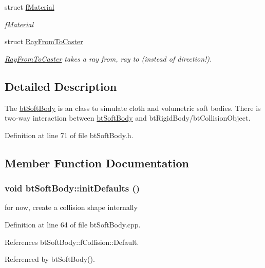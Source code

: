 \begin{CompactItemize}
struct \hyperlink{structbt_soft_body_1_1f_material}{fMaterial}
\begin{CompactList}\small\item\em \hyperlink{structbt_soft_body_1_1f_material}{fMaterial} \item\end{CompactList}\item 
struct \hyperlink{structbt_soft_body_1_1_ray_from_to_caster}{RayFromToCaster}
\begin{CompactList}\small\item\em \hyperlink{structbt_soft_body_1_1_ray_from_to_caster}{RayFromToCaster} takes a ray from, ray to (instead of direction!). \item\end{CompactList}\end{CompactItemize}


\subsection{Detailed Description}
The \hyperlink{classbt_soft_body}{btSoftBody} is an class to simulate cloth and volumetric soft bodies. There is two-way interaction between \hyperlink{classbt_soft_body}{btSoftBody} and btRigidBody/btCollisionObject. 

Definition at line 71 of file btSoftBody.h.

\subsection{Member Function Documentation}
\hypertarget{classbt_soft_body_e07c09d9c2937897c3690c1a3970bf61}{
\subsubsection[initDefaults]{\setlength{\rightskip}{0pt plus 5cm}void btSoftBody::initDefaults ()}}
\label{classbt_soft_body_e07c09d9c2937897c3690c1a3970bf61}




for now, create a collision shape internally 

Definition at line 64 of file btSoftBody.cpp.

References btSoftBody::fCollision::Default.

Referenced by btSoftBody().

